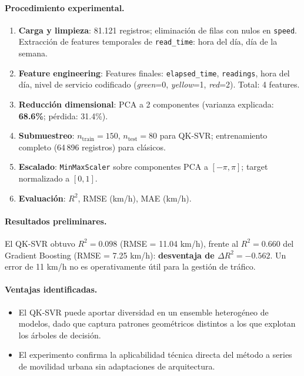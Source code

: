 \paragraph{Procedimiento experimental.}
\begin{enumerate}
  \item \textbf{Carga y limpieza}: 81.121 registros; eliminación de filas con nulos en \texttt{speed}. Extracción de features temporales de \texttt{read\_time}: hora del día, día de la semana.
  \item \textbf{Feature engineering}: Features finales: \texttt{elapsed\_time}, \texttt{readings}, hora del día, nivel de servicio codificado (\textit{green}=0, \textit{yellow}=1, \textit{red}=2). Total: 4 features.
  \item \textbf{Reducción dimensional}: PCA a 2 componentes (varianza explicada: \textbf{68.6\%}; pérdida: 31.4\%).
  \item \textbf{Submuestreo}: $n_{\text{train}} = 150$, $n_{\text{test}} = 80$ para QK-SVR; entrenamiento completo (64\,896 registros) para clásicos.
  \item \textbf{Escalado}: \texttt{MinMaxScaler} sobre componentes PCA a $[-\pi, \pi]$; target normalizado a $[0,1]$.
  \item \textbf{Evaluación}: $R^2$, RMSE (km/h), MAE (km/h).
\end{enumerate}

\paragraph{Resultados preliminares.}
El QK-SVR obtuvo $R^2 = 0.098$ (RMSE = 11.04 km/h), frente al $R^2 = 0.660$ del Gradient Boosting (RMSE = 7.25 km/h): \textbf{desventaja de $\Delta R^2 = -0.562$}. Un error de 11 km/h no es operativamente útil para la gestión de tráfico.

\paragraph{Ventajas identificadas.}
\begin{itemize}
  \item El QK-SVR puede aportar diversidad en un ensemble heterogéneo de modelos, dado que captura patrones geométricos distintos a los que explotan los árboles de decisión.
  \item El experimento confirma la aplicabilidad técnica directa del método a series de movilidad urbana sin adaptaciones de arquitectura.
\end{itemize}

